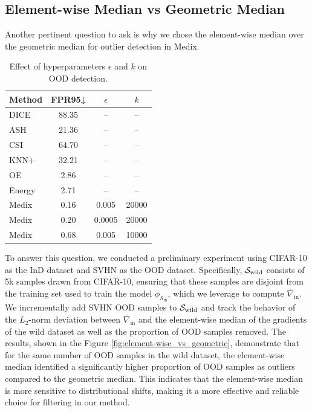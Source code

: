 \documentclass[10pt]{article} %
\theoremstyle{plain}
\theoremstyle{definition}
\begin{document}
\subsection{Element-wise Median vs Geometric Median} \label{appendix:geo_vs_element}
Another pertinent question to ask is why we chose the element-wise median over the geometric median \citep{acharya2024geometric} for outlier detection in Medix.
\begin{table}
\centering
\caption{Effect of hyperparameters $\epsilon$ and $k$ on OOD detection.}
\vspace{-0.2cm}
\footnotesize
\begin{tabular}{lccc}
\toprule
Method & FPR95↓ & $\epsilon$ & $k$ \\
\midrule
DICE & 88.35 & -- & -- \\
ASH & 21.36 & -- & -- \\
CSI & 64.70 & -- & -- \\
KNN+ & 32.21 & -- & -- \\
OE & 2.86 & -- & -- \\
Energy & 2.71 & -- & -- \\
Medix & 0.16 & 0.005 & 20000 \\
Medix & 0.20 & 0.0005 & 20000 \\
Medix & 0.68 & 0.005 & 10000 \\
\bottomrule
\end{tabular}
\vspace{-0.2cm}
\label{tab:medix_hyperparam_ablation}
\end{table}
To answer this question, we conducted a preliminary experiment using CIFAR-10 as the InD dataset and SVHN as the OOD dataset. 
Specifically, \( \mathcal{S}_{\rm wild} \) consists of 5k samples drawn from CIFAR-10, ensuring that these samples are disjoint from the training set used to train the model \( \phi_{\mathcal{S}_{\text{in}}} \), which we leverage to compute \( \bar{\nabla}_{\text{in}} \). We incrementally add SVHN OOD samples to \( \mathcal{S}_{\rm wild} \) and track the behavior of the \( L_2 \)-norm deviation between \( \bar{\nabla}_{\text{in}} \) and the element-wise median of the gradients of the wild dataset as well as the proportion of OOD samples removed.
The results, shown in the Figure \ref{fig:element-wise_vs_geometric}, demonstrate that for the same number of OOD samples in the wild dataset, the element-wise median identified a significantly higher proportion of OOD samples as outliers compared to the geometric median. This indicates that the element-wise median is more sensitive to distributional shifts, making it a more effective and reliable choice for filtering in our method.
\end{document}

